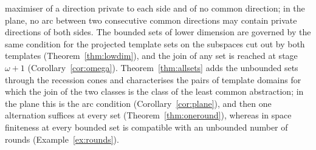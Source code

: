 \documentclass[11pt]{amsart}
\theoremstyle{definition}
\begin{document}
maximiser of a direction private to each side and of no common
direction; in the plane, no arc between two consecutive common
directions may contain private directions of both sides. The bounded
sets of lower dimension are governed by the same condition for the
projected template sets on the subspaces cut out by both templates
(Theorem~\ref{thm:lowdim}), and the join of any set is reached at stage
$\omega+1$ (Corollary~\ref{cor:omega}). Theorem~\ref{thm:allsets} adds
the unbounded sets through the recession cones and characterises the
pairs of template domains for which the join of the two classes is the
class of the least common abstraction; in the plane this is the arc
condition (Corollary~\ref{cor:plane}), and then one alternation
suffices at every set (Theorem~\ref{thm:oneround}), whereas in space
finiteness at every bounded set is compatible with an unbounded number
of rounds (Example~\ref{ex:rounds}).
\end{document}

